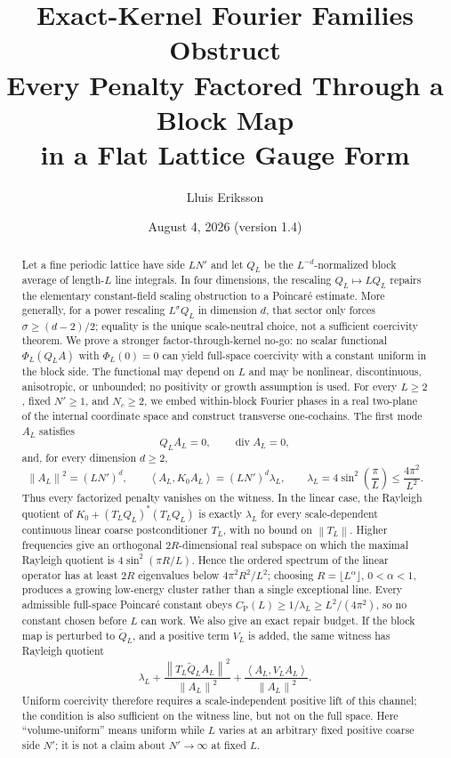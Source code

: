 \documentclass[11pt]{article}
\title{Exact-Kernel Fourier Families Obstruct\\
Every Penalty Factored Through a Block Map\\
in a Flat Lattice Gauge Form}
\author{Lluis Eriksson}
\date{August 4, 2026 (version 1.4)}
\theoremstyle{definition}
\newcommand{\CP}{C_{\mathrm P}}
\newcommand{\ip}[2]{\left\langle #1,#2\right\rangle}
\newcommand{\norm}[1]{\left\lVert #1\right\rVert}
\begin{document}
\maketitle

\begin{abstract}
Let a fine periodic lattice have side $LN'$ and let $Q_L$ be the
$L^{-d}$-normalized block average of length-$L$ line integrals.  In four
dimensions, the rescaling $Q_L\mapsto LQ_L$ repairs the elementary
constant-field scaling obstruction to a Poincar\'e estimate.  More generally,
for a power rescaling $L^\sigma Q_L$ in dimension $d$, that sector only forces
$\sigma\ge(d-2)/2$; equality is the unique scale-neutral choice, not a
sufficient coercivity theorem.  We prove a stronger factor-through-kernel
no-go: no scalar functional $\Phi_L(Q_LA)$ with $\Phi_L(0)=0$ can yield
full-space coercivity with a constant uniform in the block side.  The
functional may depend on $L$ and may be nonlinear, discontinuous, anisotropic,
or unbounded; no positivity or growth assumption is used.  For every $L\ge2$,
fixed $N'\ge1$, and $N_c\ge2$, we embed within-block Fourier phases in a real
two-plane of the internal coordinate space and construct transverse
one-cochains.  The first mode $A_L$ satisfies
\[
 Q_LA_L=0,\qquad \operatorname{div}A_L=0,
\]
and, for every dimension $d\ge2$,
\[
 \norm{A_L}^2=(LN')^d,\qquad
 \ip{A_L}{K_0A_L}=(LN')^d\lambda_L,
 \qquad
 \lambda_L=4\sin^2\!\left(\frac{\pi}{L}\right)
 \le \frac{4\pi^2}{L^2}.
\]
Thus every factorized penalty vanishes on the witness.  In the linear case,
the Rayleigh quotient of $K_0+(T_LQ_L)^*(T_LQ_L)$ is exactly $\lambda_L$ for
every scale-dependent continuous linear coarse postconditioner $T_L$, with no
bound on $\norm{T_L}$.  Higher frequencies give an orthogonal $2R$-dimensional
real subspace on which the maximal Rayleigh quotient is
$4\sin^2(\pi R/L)$.  Hence the ordered spectrum of the linear operator has at
least $2R$ eigenvalues below $4\pi^2R^2/L^2$; choosing
$R=\lfloor L^\alpha\rfloor$, $0<\alpha<1$, produces a growing low-energy
cluster rather than a single exceptional line.  Every admissible full-space Poincar\'e constant obeys
$\CP(L)\ge1/\lambda_L\ge L^2/(4\pi^2)$, so no constant chosen before $L$
can work.  We also give an exact repair budget.  If the block map is perturbed
to $\widetilde Q_L$, and a positive term $V_L$ is added, the same witness has
Rayleigh quotient
\[
 \lambda_L+\frac{\norm{T_L\widetilde Q_LA_L}^2}{\norm{A_L}^2}
 +\frac{\ip{A_L}{V_LA_L}}{\norm{A_L}^2}.
\]
Uniform coercivity therefore requires a scale-independent positive lift of
this channel; the condition is also sufficient on the witness line, but not
on the full space.  Here ``volume-uniform'' means uniform while $L$ varies at
an arbitrary fixed positive coarse side $N'$; it is not a claim about
$N'\to\infty$ at fixed $L$.


\end{abstract}
\end{document}
